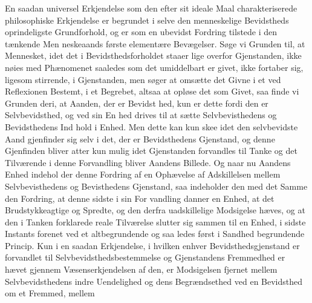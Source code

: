 \documentclass[12pt,a4paper]{book}
\begin{document}
En saadan universel Erkjendelse som den efter sit ideale
Maal charakteriserede philosophiske Erkjendelse er begrundet i
selve den menneskelige Bevidstheds oprindeligste Grundforhold,
og er som en ubevidst Fordring tilstede i den tænkende Men\-%
neskeaands første elementære Bevægelser. Søge vi Grunden
til, at Mennesket, idet det i Bevidsthedsforholdet staaer lige\-%
overfor Gjenstanden, ikke nøies med Phænomenet saaledes som
det umiddelbart er givet, ikke fortaber sig, ligesom stirrende,
i Gjenstanden, men søger at omsætte det Givne i et ved
Reflexionen Bestemt, i et Begrebet, altsaa at opløse det som
Givet, saa finde vi Grunden deri, at Aanden, der er Bevidst\-%
hed, kun er dette fordi den er Selvbevidsthed, og ved sin En\-%
hed drives til at sætte Selvbevisthedens og Bevidsthedens Ind\-%
hold i Enhed. Men dette kan kun skee idet den selvbevidste
Aand gjenfinder sig selv i det, der er Bevidsthedens Gjenstand,
og denne Gjenfinden bliver atter kun mulig idet Gjenstanden
forvandles til Tanke og det Tilværende i denne Forvandling
bliver Aandens Billede. Og naar nu Aandens Enhed indehol\-%
der denne Fordring af en Ophævelse af Adskillelsen mellem
Selvbevisthedens og Bevisthedens Gjenstand, saa indeholder den
med det Samme den Fordring, at denne sidste i sin For\-%
vandling danner en Enhed, at det Brudstykkeagtige og Spredte,
og den derfra uadskillelige Modsigelse hæves, og at den i
Tanken forklarede reale Tilværelse slutter sig sammen til en
Enhed, i sidste Instants forenet ved et altbegrundende og saa\-%
ledes først i Sandhed begrundende Princip. Kun i en saadan
Erkjendelse, i hvilken enhver Bevidsthedsgjenstand er forvandlet
til Selvbevidsthedsbestemmelse og Gjenstandens Fremmedhed
er hævet gjennem Væsenserkjendelsen af den, er Modsigelsen
fjernet mellem Selvbevidsthedens indre Uendelighed og dens
Begrændsethed ved en Bevidsthed om et Fremmed, mellem
\end{document}
